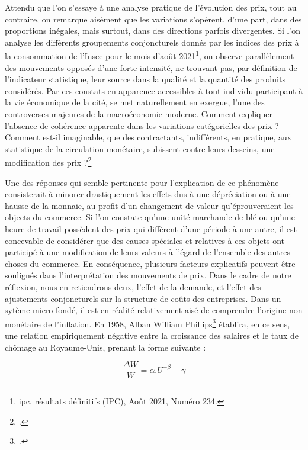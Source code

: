 {Attendu que l'on s'essaye à une analyse pratique de l'évolution des prix, tout au contraire, on remarque aisément que les variations s'opèrent, d'une part, dans des proportions inégales, mais surtout, dans des directions parfois divergentes. Si l'on analyse les différents groupements conjoncturels donnés par les indices des prix à la consommation de l'\acrshort{Insee} pour le mois d'août 2021\footnote{\gls{ipc}, résultats définitifs (IPC), Août 2021, Numéro 234.}, on observe parallèlement des mouvements opposés d'une forte intensité, ne trouvant pas, par définition de l'indicateur statistique, leur source dans la qualité et la quantité des produits considérés. Par ces constats en apparence accessibles à tout individu participant à la vie économique de la cité, se met naturellement en exergue, l'une des controverses majeures de la macroéconomie moderne. Comment expliquer l'absence de cohérence apparente dans les variations catégorielles des prix ? Comment est-il imaginable, que des contractants, indifférents, en pratique, aux statistique de la circulation monétaire, subissent contre leurs desseins, une modification des prix ?\footnote{.}\par

Une des réponses qui semble pertinente pour l'explication de ce phénomène consisterait à minorer drastiquement les effets dus à une dépréciation ou à une hausse de la monnaie, au profit d'un changement de valeur qu'éprouveraient les objects du commerce. Si l'on constate qu'une unité marchande de blé ou qu'une heure de travail possèdent des prix qui diffèrent d'une période à une autre, il est concevable de considérer que des causes spéciales et relatives à ces objets ont participé à une modification de leurs valeurs à l'égard de l'ensemble des autres choses du commerce. En conséquence, plusieurs facteurs explicatifs peuvent être soulignés dans l'interprétation des mouvements de prix. Dans le cadre de notre réflexion, nous en retiendrons deux, l'effet de la demande, et l'effet des ajustements conjoncturels sur la structure de coûts des entreprises. Dans un sytème micro-fondé, il est en réalité relativement aisé de comprendre l'origine non monétaire de l'inflation. En 1958, Alban William Phillips\footnote{.} établira, en ce sens, une relation empiriquement négative entre la croissance des salaires et le taux de chômage au Royaume-Unis, prenant la forme suivante :\par

\[  \frac{\Delta W}{W}= \alpha.U^{-\beta}- \gamma \]
	
}
